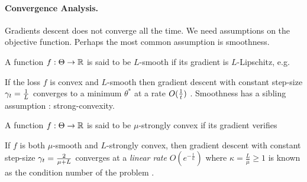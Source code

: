 \paragraph{Convergence Analysis.}
Gradients descent does not converge all the time. 
We need assumptions on the objective function.
Perhaps the most common assumption is smoothness.
\begin{definition}[smoothness]
	A function $f:\Theta \rightarrow\mathbb{R}$ is said to be $L$-smooth if its gradient is $L$-Lipschitz, e.g.
\end{definition}
If the loss  $f$ is convex and $L$-smooth then gradient descent with constant step-size $\gamma_t = \frac{1}{L}$ converges to a minimum $\theta^*$ at a rate $O(\frac{1}{t})$ \citep[corollary 2.1.2]{nesterov2004Intro}. 
Smoothness has a sibling assumption : strong-convexity.
\begin{definition}
	A function $f:\Theta \rightarrow\mathbb{R}$ is said to be $\mu$-strongly convex if its gradient verifies
\end{definition}
If $f$ is both $\mu$-smooth and $L$-strongly convex, then gradient descent with constant step-size $\gamma_t = \frac{2}{\mu + L}$ converges at a \emph{linear rate} $O(e^{-\frac{t}{\kappa}})$ where $\kappa= \frac{L}{\mu} \geq 1$ is known as the condition number of the problem \citep[theorem 2.1.15]{nesterov2004Intro}.

